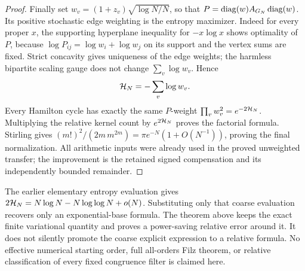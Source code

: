 \begin{proof}
Finally set
\(w_v=(1+z_v)\sqrt{\log N/N}\), so that
\(P=\operatorname{diag}(w)A_{G_N}\operatorname{diag}(w)\).
Its positive stochastic edge weighting is the entropy
maximizer. Indeed for every proper \(x\), the supporting
hyperplane inequality for \(-x\log x\) shows optimality
of \(P\), because
\(\log P_{ij}=\log w_i+\log w_j\) on its support and
the vertex sums are fixed.
Strict concavity gives uniqueness of the edge weights;
the harmless bipartite scaling gauge does not change
\(\sum_v\log w_v\).
Hence
\[
 {\cal H}_N=-\sum_v\log w_v.
\]
Every Hamilton cycle has exactly the same \(P\)-weight
\(\prod_v w_v^2=e^{-2{\cal H}_N}\).
Multiplying the relative kernel count by
\(e^{2{\cal H}_N}\) proves the factorial formula.
Stirling gives
\((m!)^2/(2m\,m^{2m})=\pi e^{-N}(1+O(N^{-1}))\),
proving the final normalization.
All arithmetic inputs were already used in the proved
unweighted transfer; the improvement is the retained
signed compensation and its independently bounded remainder.
\end{proof}

\begin{remark}
The earlier elementary entropy evaluation gives
\(2{\cal H}_N=N\log N-N\log\log N+o(N)\).
Substituting only that coarse evaluation recovers only
an exponential-base formula.
The theorem above keeps the exact finite variational
quantity and proves a power-saving relative error around
it. It does not silently promote the coarse explicit
expression to a relative formula.
No effective numerical starting order, full all-orders
Filz theorem, or relative classification of every fixed
congruence filter is claimed here.
\end{remark}
